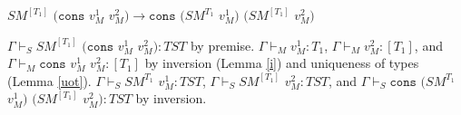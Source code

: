 \begin{case}
$SM^{[T_{1}]}$ $(\mathtt{cons}$ $v_{M}^{1}$ $v_{M}^{2})\rightarrow\mathtt{cons}$ $(SM^{T_{1}}$ $v_{M}^{1})$ $(SM^{[T_{1}]}$ $v_{M}^{2})$

$\Gamma\vdash_{S}SM^{[T_{1}]}$ $(\mathtt{cons}$ $v_{M}^{1}$ $v_{M}^{2}):TST$ by premise.  $\Gamma\vdash_{M}v_{M}^{1}:T_{1}$, $\Gamma\vdash_{M}v_{M}^{2}:[T_{1}]$, and $\Gamma\vdash_{M}\mathtt{cons}$ $v_{M}^{1}$ $v_{M}^{2}:[T_{1}]$ by inversion (Lemma \ref{i}) and uniqueness of types (Lemma \ref{uot}).  $\Gamma\vdash_{S}SM^{T_{1}}$ $v_{M}^{1}:TST$, $\Gamma\vdash_{S}SM^{[T_{1}]}$ $v_{M}^{2}:TST$, and $\Gamma\vdash_{S}\mathtt{cons}$ $(SM^{T_{1}}$ $v_{M}^{1})$ $(SM^{[T_{1}]}$ $v_{M}^{2}):TST$ by inversion.
\end{case}